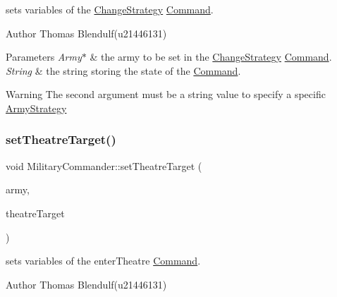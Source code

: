 sets variables of the \mbox{\hyperlink{class_change_strategy}{Change\+Strategy}} \mbox{\hyperlink{class_command}{Command}}. 

\begin{DoxyAuthor}{Author}
Thomas Blendulf(u21446131) 
\end{DoxyAuthor}

\begin{DoxyParams}{Parameters}
{\em Army$\ast$} & the army to be set in the \mbox{\hyperlink{class_change_strategy}{Change\+Strategy}} \mbox{\hyperlink{class_command}{Command}}. \\
\hline
{\em String} & the string storing the state of the \mbox{\hyperlink{class_command}{Command}}. \\
\hline
\end{DoxyParams}
\begin{DoxyWarning}{Warning}
The second argument must be a string value to specify a specific \mbox{\hyperlink{class_army_strategy}{Army\+Strategy}} 
\end{DoxyWarning}
\mbox{\label{class_military_commander_a061489dab4cb1f0255e901534daaa4a9}} 
\subsubsection{\texorpdfstring{setTheatreTarget()}{setTheatreTarget()}}
{\footnotesize\ttfamily void Military\+Commander\+::set\+Theatre\+Target (\begin{DoxyParamCaption}\item[{\mbox{\hyperlink{class_army}{Army}} $\ast$}]{army,  }\item[{\mbox{\hyperlink{class_war_theatre}{War\+Theatre}} $\ast$}]{theatre\+Target }\end{DoxyParamCaption})}



sets variables of the enter\+Theatre \mbox{\hyperlink{class_command}{Command}}. 

\begin{DoxyAuthor}{Author}
Thomas Blendulf(u21446131) 
\end{DoxyAuthor}


